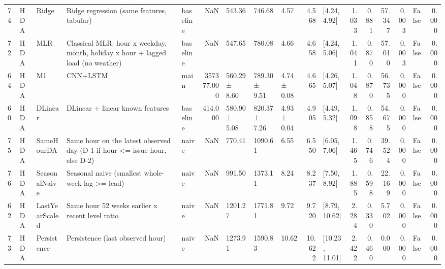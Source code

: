 \begin{tabular}{lllllrlllrlrrrrlr}
74 & HDA & Ridge & Ridge regression (same features, tabular) & baseline & NaN & 543.36 & 746.68 & 4.57 & 4.568 & [4.24, 4.92] & 1.033 & 0.881 & 57.347 & 0.003 & False & 0.000 \\
72 & HDA & MLR & Classical MLR: hour x weekday, month, holiday x hour + lagged load (no weather) & baseline & NaN & 547.65 & 780.08 & 4.66 & 4.658 & [4.24, 5.06] & 1.041 & 0.870 & 57.010 & 0.003 & False & 0.000 \\
64 & HDA & M1 & CNN+LSTM & main & 357377.000 & 560.29 ± 8.60 & 789.30 ± 9.51 & 4.74 ± 0.08 & 4.665 & [4.26, 5.07] & 1.048 & 0.870 & 56.735 & 0.000 & False & 0.000 \\
60 & HDA & DLinear & DLinear + linear known features & baseline & 414.000 & 580.90 ± 5.08 & 820.37 ± 7.26 & 4.93 ± 0.04 & 4.905 & [4.49, 5.32] & 1.098 & 0.858 & 54.675 & 0.000 & False & 0.000 \\
75 & HDA & SameHourDA & Same hour on the latest observed day (D-1 if hour <= issue hour, else D-2) & naive & NaN & 770.41 & 1090.61 & 6.55 & 6.550 & [6.05, 7.06] & 1.465 & 0.746 & 39.524 & 0.000 & False & 0.000 \\
76 & HDA & SeasonalNaive & Seasonal naive (smallest whole-week lag >= lead) & naive & NaN & 991.50 & 1373.11 & 8.24 & 8.237 & [7.50, 8.92] & 1.885 & 0.598 & 22.169 & 0.000 & False & 0.000 \\
62 & HDA & LastYearScaled & Same hour 52 weeks earlier x recent level ratio & naive & NaN & 1201.27 & 1771.81 & 9.72 & 9.720 & [8.79, 10.62] & 2.284 & 0.330 & 5.702 & 0.000 & False & 0.000 \\
73 & HDA & Persistence & Persistence (last observed hour) & naive & NaN & 1273.91 & 1590.83 & 10.62 & 10.622 & [10.23, 11.01] & 2.422 & 0.460 & 0.000 & 0.000 & False & 0.000 \\
\bottomrule
\end{tabular}
